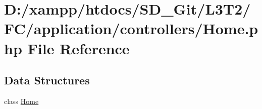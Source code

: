\hypertarget{application_2controllers_2_home_8php}{}\section{D\+:/xampp/htdocs/\+S\+D\+\_\+\+Git/\+L3\+T2/\+F\+C/application/controllers/\+Home.php File Reference}
\label{application_2controllers_2_home_8php}
\subsection*{Data Structures}
\begin{DoxyCompactItemize}
\item 
class \hyperlink{class_home}{Home}
\end{DoxyCompactItemize}
